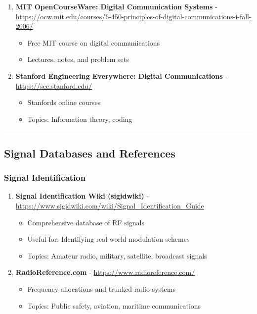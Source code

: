 \begin{enumerate}
\def\labelenumi{\arabic{enumi}.}
\setcounter{enumi}{40}
\tightlist
\item
  \textbf{MIT OpenCourseWare: Digital Communication Systems} - \url{https://ocw.mit.edu/courses/6-450-principles-of-digital-communications-i-fall-2006/}

  \begin{itemize}
  \tightlist
  \item
    Free MIT course on digital communications
  \item
    Lectures, notes, and problem sets
  \end{itemize}
\item
  \textbf{Stanford Engineering Everywhere: Digital Communications} - \url{https://see.stanford.edu/}

  \begin{itemize}
  \tightlist
  \item
    Stanford\textquotesingle s online courses
  \item
    Topics: Information theory, coding
  \end{itemize}
\end{enumerate}

\begin{center}\rule{0.5\linewidth}{0.5pt}\end{center}

\subsection{\texorpdfstring{Signal Databases and References}{Signal Databases and References}}\label{signal-databases-and-references}

\subsubsection{Signal Identification}\label{signal-identification}

\begin{enumerate}
\def\labelenumi{\arabic{enumi}.}
\setcounter{enumi}{42}
\tightlist
\item
  \textbf{Signal Identification Wiki (sigidwiki)} - \url{https://www.sigidwiki.com/wiki/Signal_Identification_Guide}

  \begin{itemize}
  \tightlist
  \item
    Comprehensive database of RF signals
  \item
    Useful for: Identifying real-world modulation schemes
  \item
    Topics: Amateur radio, military, satellite, broadcast signals
  \end{itemize}
\item
  \textbf{RadioReference.com} - \url{https://www.radioreference.com/}

  \begin{itemize}
  \tightlist
  \item
    Frequency allocations and trunked radio systems
  \item
    Topics: Public safety, aviation, maritime communications
  \end{itemize}
\end{enumerate}

